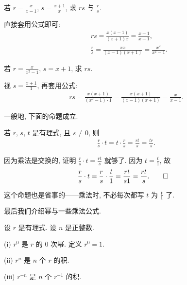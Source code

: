\begin{example}
    若 $r = \frac{x}{x - 1}$, $s = \frac{x + 1}{x}$, 求 $rs$ 与 $\frac{r}{s}$.

    直接套用公式即可:
    \begin{align*}
         & rs = \frac{x (x - 1)}{(x + 1) x} = \frac{x - 1}{x + 1},         \\
         & \frac{r}{s} = \frac{x x}{(x - 1)(x + 1)} = \frac{x^2}{x^2 - 1}.
    \end{align*}
\end{example}

\begin{example}
    若 $r = \frac{x}{x^2 - 1}$, $s = x + 1$, 求 $rs$.

    视 $s = \frac{x+1}{1}$, 再套用公式:
    \begin{align*}
        rs = \frac{x (x + 1)}{(x^2 - 1) \cdot 1} = \frac{x (x + 1)}{(x - 1)(x + 1)} = \frac{x}{x - 1}.
    \end{align*}
\end{example}

一般地, 下面的命题成立.
\begin{proposition}
    若 $r$, $s$, $t$ 是有理式, 且 $s \neq 0$, 则
    \begin{align*}
        \frac{r}{s} \cdot t = t \cdot \frac{r}{s} = \frac{rt}{s} = \frac{tr}{s}.
    \end{align*}
\end{proposition}

\begin{pf}
    因为乘法是交换的, 证明 $\frac{r}{s} \cdot t = \frac{rt}{s}$ 就够了. 因为 $t = \frac{t}{1}$, 故
    \begin{align*}
         & \frac{r}{s} \cdot t = \frac{r}{s} \cdot \frac{t}{1} = \frac{rt}{s1} = \frac{rt}{s}. \qedhere
    \end{align*}
\end{pf}

\begin{remark}
    这个命题也是省事的——乘法时, 不必每次都写 $t$ 为 $\frac{t}{1}$ 了.
\end{remark}

\myLine

最后我们介绍幂与一些乘法公式.

\begin{definition}
    设 $r$ 是有理式. 设 $n$ 是正整数.

    (i) $r^0$ 是 $r$ 的 $0$ 次幂. 定义 $r^0 = 1$.

    (ii) $r^n$ 是 $n$ 个 $r$ 的积.

    (iii) $r^{-n}$ 是 $n$ 个 $r^{-1}$ 的积.
\end{definition}

